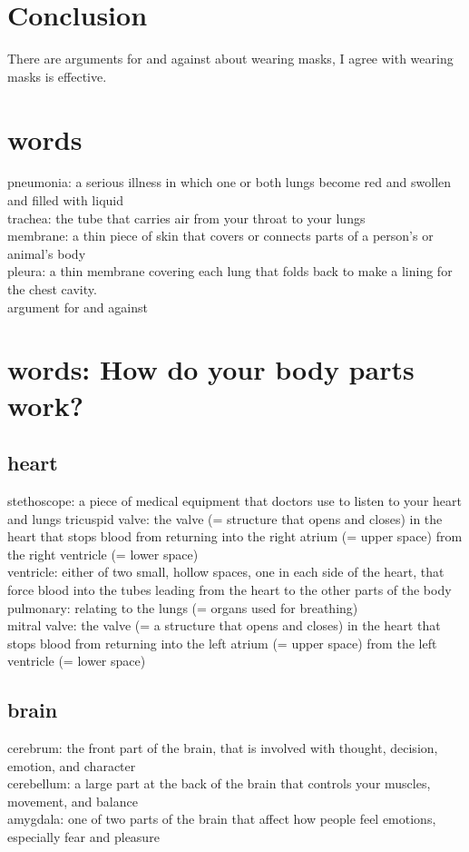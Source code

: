 \documentclass{article}
\begin{document}
\section{Conclusion}
There are arguments for and against about wearing masks, I agree with wearing masks is effective. 


\section{words}
pneumonia: a serious illness in which one or both lungs become red and swollen and filled with liquid\\
trachea: the tube that carries air from your throat to your lungs\\
membrane: a thin piece of skin that covers or connects parts of a person's or animal's body\\
pleura: a thin membrane covering each lung that folds back to make a lining for the chest cavity.\\
argument for and against\\

\section{words: How do your body parts work?}

\subsection{heart}
stethoscope: a piece of medical equipment that doctors use to listen to your heart and lungs
tricuspid valve: the valve (= structure that opens and closes) in the heart that stops blood from returning into the right atrium (= upper space) from the right ventricle (= lower space)\\
ventricle: either of two small, hollow spaces, one in each side of the heart, that force blood into the tubes leading from the heart to the other parts of the body\\
pulmonary: relating to the lungs (= organs used for breathing)\\
mitral valve: the valve (= a structure that opens and closes) in the heart that stops blood from returning into the left atrium (= upper space) from the left ventricle (= lower space)\\

\subsection{brain}
cerebrum: the front part of the brain, that is involved with thought, decision, emotion, and character\\
cerebellum: a large part at the back of the brain that controls your muscles, movement, and balance\\
amygdala: one of two parts of the brain that affect how people feel emotions, especially fear and pleasure\\
\end{document}
